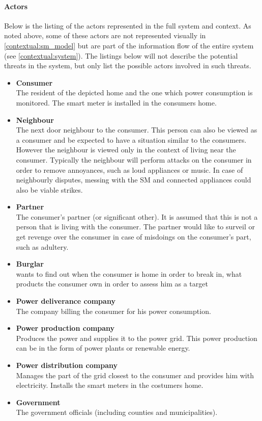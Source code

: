 \paragraph{Actors}
Below is the listing of the actors represented in the full system and context.
As noted above, some of these actors are not represented visually in \cref{contextual:sm_model} but are part of the information flow of the entire system (see \cref{contextual:system}).
The listings below will not describe the potential threats in the system, but only list the possible actors involved in such threats.
\begin{itemize}
\item \textbf{Consumer}\\
The resident of the depicted home and the one which power consumption is monitored.
The smart meter is installed in the consumers home.

\item \textbf{Neighbour}\\
The next door neighbour to the consumer.
This person can also be viewed as a consumer and be expected to have a situation similar to the consumers.
However the neighbour is viewed only in the context of living near the consumer.
Typically the neighbour will perform attacks on the consumer in order to remove annoyances, such as loud appliances or music.
In case of neighbourly disputes, messing with the SM and connected appliances could also be viable strikes.
\item \textbf{Partner}\\
The consumer's partner (or significant other).
It is assumed that this is not a person that is living with the consumer.
The partner would like to surveil or get revenge over the consumer in case of misdoings on the consumer's part, such as adultery.
\item \textbf{Burglar}\\ wants to find out when the consumer is home in order to break in, what products the consumer own in order to assess him as a target

\item \textbf{Power deliverance company}\\
The company billing the consumer for his power consumption.
\item \textbf{Power production company}\\
Produces the power and supplies it to the power grid.
This power production can be in the form of power plants or renewable energy.
\item \textbf{Power distribution company}\\
Manages the part of the grid closest to the consumer and provides him with electricity.
Installs the smart meters in the costumers home.
\item \textbf{Government}\\
The government officials (including counties and municipalities).


\end{itemize}

